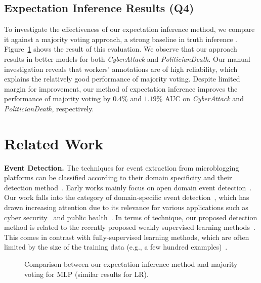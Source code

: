\documentclass[letterpaper]{article}
\begin{document}
\subsection{Expectation Inference Results (Q4)}
To investigate the effectiveness of our expectation inference method, we compare it against a majority voting approach, a strong baseline in truth inference \cite{zheng2017truth}. Figure~\ref{fig:Q3} shows the result of this evaluation. We observe that our approach results in better models for both \emph{CyberAttack} and \emph{PoliticianDeath}. Our manual investigation reveals that workers' annotations are of high reliability, which explains the relatively good performance of majority voting. Despite limited margin for improvement, our method of expectation inference improves the performance of majority voting by $0.4\%$ and $1.19\%$ AUC on \emph{CyberAttack} and \emph{PoliticianDeath}, respectively.

\section{Related Work}
\label{sec:related}

\noindent\textbf{Event Detection.}
The techniques for event extraction from microblogging platforms can be classified according to their domain specificity and their detection method~\cite{atefeh2015survey}. Early works mainly focus on open domain event detection~\cite{benson2011event,ritter2012open,chierichetti2014event}. Our work falls into the category of domain-specific event detection~\cite{bhardwaj2019TKDE}, which has drawn increasing attention due to its relevance for various applications such as cyber security~\cite{ritter2015weakly,chambers2018detecting} and public health~\cite{akbari2016tweets,lee2017adverse}. In terms of  technique, our proposed detection method is related to the recently proposed weakly supervised learning methods~\cite{ritter2015weakly,chang2016expectation,konovalov2017learning}. This comes in contrast with fully-supervised learning methods, which are often limited by the size of the training data (e.g., a few hundred examples)~\cite{sakaki2010earthquake,sadri2016online}.


\begin{figure}
       \centering
        \caption{Comparison between our expectation inference method and majority voting for MLP (similar results for LR).}
        \label{fig:Q3}
\end{figure}
\end{document}
